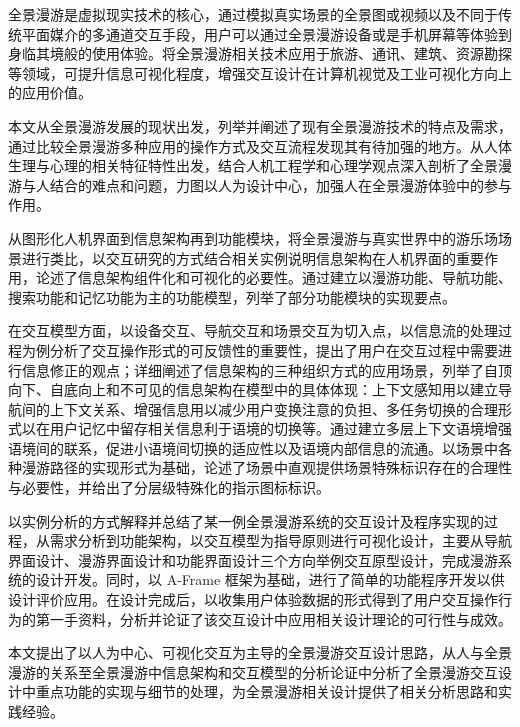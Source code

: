 \begin{cnabstract}
\begin{spacing}{1.0}
全景漫游是虚拟现实技术的核心，通过模拟真实场景的全景图或视频以及不同于传统平面媒介的多通道交互手段，用户可以通过全景漫游设备或是手机屏幕等体验到身临其境般的使用体验。将全景漫游相关技术应用于旅游、通讯、建筑、资源勘探等领域，可提升信息可视化程度，增强交互设计在计算机视觉及工业可视化方向上的应用价值。

本文从全景漫游发展的现状出发，列举并阐述了现有全景漫游技术的特点及需求，通过比较全景漫游多种应用的操作方式及交互流程发现其有待加强的地方。从人体生理与心理的相关特征特性出发，结合人机工程学和心理学观点深入剖析了全景漫游与人结合的难点和问题，力图以人为设计中心，加强人在全景漫游体验中的参与作用。

从图形化人机界面到信息架构再到功能模块，将全景漫游与真实世界中的游乐场场景进行类比，以交互研究的方式结合相关实例说明信息架构在人机界面的重要作用，论述了信息架构组件化和可视化的必要性。通过建立以漫游功能、导航功能、搜索功能和记忆功能为主的功能模型，列举了部分功能模块的实现要点。

在交互模型方面，以设备交互、导航交互和场景交互为切入点，以信息流的处理过程为例分析了交互操作形式的可反馈性的重要性，提出了用户在交互过程中需要进行信息修正的观点；详细阐述了信息架构的三种组织方式的应用场景，列举了自顶向下、自底向上和不可见的信息架构在模型中的具体体现：上下文感知用以建立导航间的上下文关系、增强信息用以减少用户变换注意的负担、多任务切换的合理形式以在用户记忆中留存相关信息利于语境的切换等。通过建立多层上下文语境增强语境间的联系，促进小语境间切换的适应性以及语境内部信息的流通。以场景中各种漫游路径的实现形式为基础，论述了场景中直观提供场景特殊标识存在的合理性与必要性，并给出了分层级特殊化的指示图标标识。

以实例分析的方式解释并总结了某一例全景漫游系统的交互设计及程序实现的过程，从需求分析到功能架构，以交互模型为指导原则进行可视化设计，主要从导航界面设计、漫游界面设计和功能界面设计三个方向举例交互原型设计，完成漫游系统的设计开发。同时，以 A-Frame 框架为基础，进行了简单的功能程序开发以供设计评价应用。在设计完成后，以收集用户体验数据的形式得到了用户交互操作行为的第一手资料，分析并论证了该交互设计中应用相关设计理论的可行性与成效。

本文提出了以人为中心、可视化交互为主导的全景漫游交互设计思路，从人与全景漫游的关系至全景漫游中信息架构和交互模型的分析论证中分析了全景漫游交互设计中重点功能的实现与细节的处理，为全景漫游相关设计提供了相关分析思路和实践经验。

\end{spacing}
\end{cnabstract}


